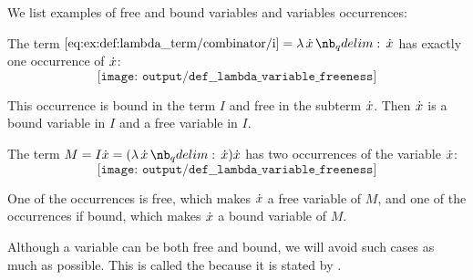 \begin{example}\label{ex:def:lambda_variable_freeness}
  We list examples of free and bound variables and variables occurrences:
  \begin{thmenum}
     The term \( \ref{eq:ex:def:lambda_term/combinator/i} = \qabs \synx \synx \) has exactly one occurrence of \( {\dot{x}} \):
    \begin{equation*}
      \texttt{[image: output/def\_\_lambda\_variable\_freeness]}
    \end{equation*}

     This occurrence is bound in the term \( I \) and free in the subterm \( {\dot{x}} \). Then \( {\dot{x}} \) is a bound variable in \( I \) and a free variable in \( I \).

     The term \( M = I \synx = (\qabs \synx \synx) \synx \) has two occurrences of the variable \( {\dot{x}} \):
    \begin{equation*}
      \texttt{[image: output/def\_\_lambda\_variable\_freeness]}
    \end{equation*}

    One of the occurrences is free, which makes \( {\dot{x}} \) a free variable of \( M \), and one of the occurrences if bound, which makes \( {\dot{x}} \) a bound variable of \( M \).
  \end{thmenum}
\end{example}

\begin{remark}\label{rem:barendregt_convention}
  Although a variable can be both free and bound, we will avoid such cases as much as possible. This is called the  because it is stated by .
\end{remark}

